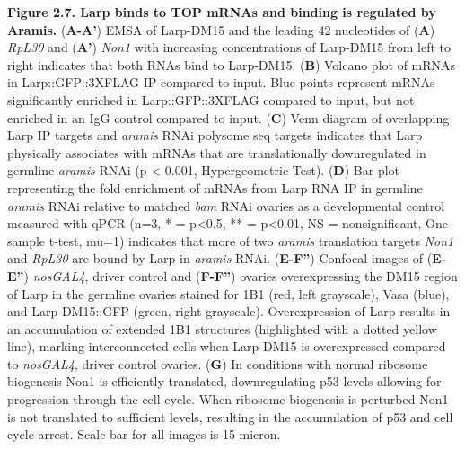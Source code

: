 \documentclass[12pt,twoside]{reedthesis}
\begin{document}
\textbf{Figure 2.7. Larp binds to TOP mRNAs and binding is regulated by
Aramis.} (\textbf{A-A'}) EMSA of Larp-DM15 and the leading 42 nucleotides of
(\textbf{A}) \emph{RpL30} and (\textbf{A'}) \emph{Non1} with increasing concentrations of
Larp-DM15 from left to right indicates that both RNAs bind to Larp-DM15.
(\textbf{B}) Volcano plot of mRNAs in Larp::GFP::3XFLAG IP compared to input.
Blue points represent mRNAs significantly enriched in Larp::GFP::3XFLAG
compared to input, but not enriched in an IgG control compared to input.
(\textbf{C}) Venn diagram of overlapping Larp IP targets and \emph{aramis} RNAi
polysome seq targets indicates that Larp physically associates with
mRNAs that are translationally downregulated in germline \emph{aramis} RNAi
(p \textless{} 0.001, Hypergeometric Test). (\textbf{D}) Bar plot representing the
fold enrichment of mRNAs from Larp RNA IP in germline \emph{aramis} RNAi
relative to matched \emph{bam} RNAi ovaries as a developmental control
measured with qPCR (n=3, * = p\textless0.5, ** = p\textless0.01, NS =
nonsignificant, One-sample t-test, mu=1) indicates that more of two
\emph{aramis} translation targets \emph{Non1} and \emph{RpL30} are bound by Larp in
\emph{aramis} RNAi. (\textbf{E-F''}) Confocal images of (\textbf{E-E''}) \emph{nosGAL4},
driver control and (\textbf{F-F''}) ovaries overexpressing the DM15 region of
Larp in the germline ovaries stained for 1B1 (red, left grayscale), Vasa
(blue), and Larp-DM15::GFP (green, right grayscale). Overexpression of
Larp results in an accumulation of extended 1B1 structures (highlighted
with a dotted yellow line), marking interconnected cells when Larp-DM15
is overexpressed compared to \emph{nosGAL4}, driver control ovaries. (\textbf{G})
In conditions with normal ribosome biogenesis Non1 is efficiently
translated, downregulating p53 levels allowing for progression through
the cell cycle. When ribosome biogenesis is perturbed Non1 is not
translated to sufficient levels, resulting in the accumulation of p53
and cell cycle arrest. Scale bar for all images is 15 micron.
\end{document}
